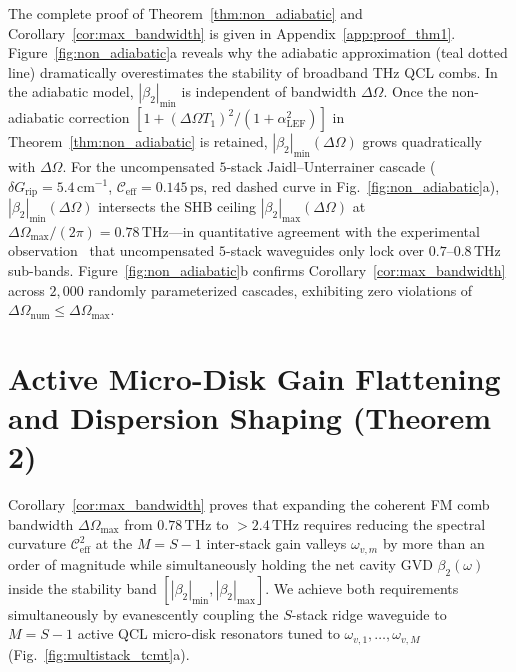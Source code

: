 \documentclass[11pt,letterpaper]{article}
\begin{document}
The complete proof of Theorem~\ref{thm:non_adiabatic} and Corollary~\ref{cor:max_bandwidth} is given in Appendix~\ref{app:proof_thm1}. Figure~\ref{fig:non_adiabatic}a reveals why the adiabatic approximation (teal dotted line) dramatically overestimates the stability of broadband THz QCL combs. In the adiabatic model, $|\beta_2|_{\min}$ is independent of bandwidth $\Delta\Omega$. Once the non-adiabatic correction $[1 + (\Delta\Omega T_1)^2/(1 + \alpha_{\mathrm{LEF}}^2)]$ in Theorem~\ref{thm:non_adiabatic} is retained, $|\beta_2|_{\min}(\Delta\Omega)$ grows quadratically with $\Delta\Omega$. For the uncompensated $5$-stack Jaidl--Unterrainer cascade ($\delta G_{\mathrm{rip}} = 5.4\,\mathrm{cm}^{-1}$, $\mathcal{C}_{\mathrm{eff}} = 0.145\,\mathrm{ps}$, red dashed curve in Fig.~\ref{fig:non_adiabatic}a), $|\beta_2|_{\min}(\Delta\Omega)$ intersects the SHB ceiling $|\beta_2|_{\max}(\Delta\Omega)$ at $\Delta\Omega_{\max}/(2\pi) = 0.78\,\mathrm{THz}$---in quantitative agreement with the experimental observation~\cite{Jaidl2021,JaidlUnterrainerRoadmap2025} that uncompensated $5$-stack waveguides only lock over $0.7\text{--}0.8\,\mathrm{THz}$ sub-bands. Figure~\ref{fig:non_adiabatic}b confirms Corollary~\ref{cor:max_bandwidth} across $2{,}000$ randomly parameterized cascades, exhibiting zero violations of $\Delta\Omega_{\mathrm{num}} \le \Delta\Omega_{\max}$.

\section{Active Micro-Disk Gain Flattening and Dispersion Shaping (Theorem 2)}
\label{sec:theorem2}

Corollary~\ref{cor:max_bandwidth} proves that expanding the coherent FM comb bandwidth $\Delta\Omega_{\max}$ from $0.78\,\mathrm{THz}$ to $>2.4\,\mathrm{THz}$ requires reducing the spectral curvature $\mathcal{C}_{\mathrm{eff}}^2$ at the $M = S - 1$ inter-stack gain valleys $\omega_{v,m}$ by more than an order of magnitude while simultaneously holding the net cavity GVD $\beta_2(\omega)$ inside the stability band $[|\beta_2|_{\min}, |\beta_2|_{\max}]$. We achieve both requirements simultaneously by evanescently coupling the $S$-stack ridge waveguide to $M = S - 1$ active QCL micro-disk resonators tuned to $\omega_{v,1}, \dots, \omega_{v,M}$ (Fig.~\ref{fig:multistack_tcmt}a).
\end{document}
